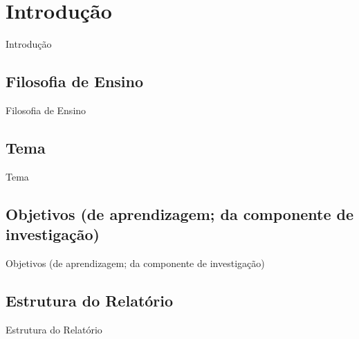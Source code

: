 \chapter{Introdução}


Introdução

\section{Filosofia de Ensino}
Filosofia de Ensino
\section{Tema}
Tema
\section{Objetivos (de aprendizagem; da componente de investigação)}
Objetivos (de aprendizagem; da componente de investigação)
\section{Estrutura do Relatório}
Estrutura do Relatório
